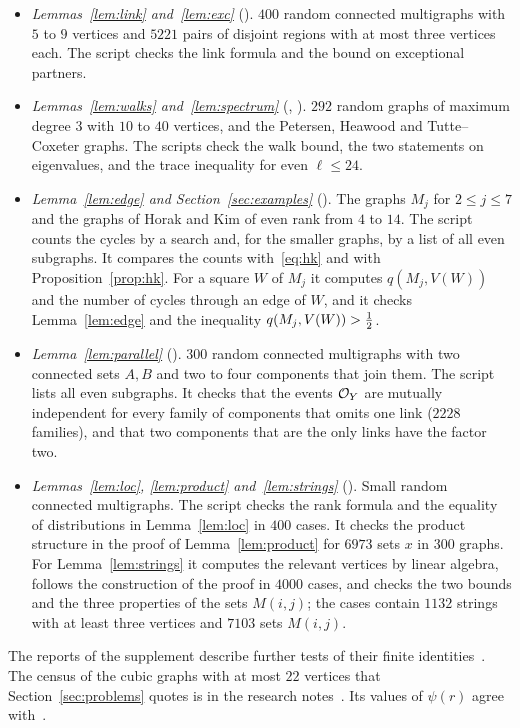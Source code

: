 \begin{itemize}
graph is pancyclic, and the number of chords never exceeds $\lfloor\log n\rfloor+\lgs n+1$.
\item \emph{Lemmas~\ref{lem:link} and~\ref{lem:exc}} (). $400$ random connected
multigraphs with $5$ to $9$ vertices and $5221$ pairs of disjoint regions with at most three
vertices each. The script checks the link formula and the bound on exceptional partners.
\item \emph{Lemmas~\ref{lem:walks} and~\ref{lem:spectrum}} (,
). $292$ random graphs of maximum degree $3$ with $10$ to $40$ vertices, and the
Petersen, Heawood and Tutte--Coxeter graphs. The scripts check the walk bound, the two statements
on eigenvalues, and the trace inequality for even $\ell\le24$.
\item \emph{Lemma~\ref{lem:edge} and Section~\ref{sec:examples}} ().
The graphs $M_j$ for $2\le j\le7$ and the graphs of Horak and Kim of even rank from $4$ to $14$. The
script counts the cycles by a search and, for the smaller graphs, by a list of all even subgraphs.
It compares the counts with~\eqref{eq:hk} and with Proposition~\ref{prop:hk}. For a square $W$ of
$M_j$ it computes $q(M_j,V(W))$ and the number of cycles through an edge of $W$, and it checks
Lemma~\ref{lem:edge} and the inequality $q(M_j,V(W))>\tfrac12$.
\item \emph{Lemma~\ref{lem:parallel}} (). $300$ random connected
multigraphs with two connected sets $A,B$ and two to four components that join them. The script
lists all even subgraphs. It checks that the events $\mathcal{O}_Y$ are mutually independent for every
family of components that omits one link ($2228$ families), and that two components that are the
only links have the factor two.
\item \emph{Lemmas~\ref{lem:loc}, \ref{lem:product} and~\ref{lem:strings}}
(). Small random connected multigraphs. The script checks the rank formula
and the equality of distributions in Lemma~\ref{lem:loc} in $400$ cases. It checks the product
structure in the proof of Lemma~\ref{lem:product} for $6973$ sets $x$ in $300$ graphs. For
Lemma~\ref{lem:strings} it computes the relevant vertices by linear algebra, follows the
construction of the proof in $4000$ cases, and checks the two bounds and the three properties of
the sets $M(i,j)$; the cases contain $1132$ strings with at least three vertices and $7103$ sets
$M(i,j)$.
\end{itemize}

The reports of the supplement describe further tests of their finite identities~\cite{S0,S1,S2}.
The census of the cubic graphs with at most $22$ vertices that Section~\ref{sec:problems} quotes is
in the research notes~\cite{S5}. Its values of $\psi(r)$ agree with~\cite{Markstrom}.
